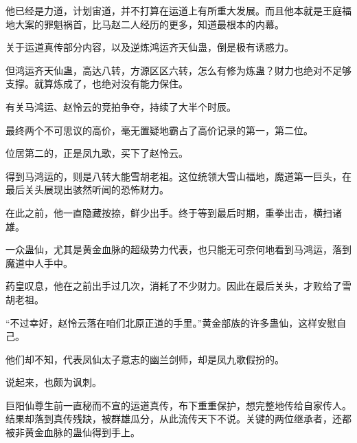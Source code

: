 \begin{this_body}
他已经是力道，计划宙道，并不打算在运道上有所重大发展。而且他本就是王庭福地大案的罪魁祸首，比马赵二人经历的更多，知道最根本的内幕。

关于运道真传部分内容，以及逆炼鸿运齐天仙蛊，倒是极有诱惑力。

但鸿运齐天仙蛊，高达八转，方源区区六转，怎么有修为炼蛊？财力也绝对不足够支撑。就算炼成了，也绝对没有能力保住。

有关马鸿运、赵怜云的竞拍争夺，持续了大半个时辰。

最终两个不可思议的高价，毫无置疑地霸占了高价记录的第一，第二位。

位居第二的，正是凤九歌，买下了赵怜云。

得到马鸿运的，则是八转大能雪胡老祖。这位统领大雪山福地，魔道第一巨头，在最后关头展现出骇然听闻的恐怖财力。

在此之前，他一直隐藏按捺，鲜少出手。终于等到最后时期，重拳出击，横扫诸雄。

一众蛊仙，尤其是黄金血脉的超级势力代表，也只能无可奈何地看到马鸿运，落到魔道中人手中。

药皇叹息，他在之前出手过几次，消耗了不少财力。因此在最后关头，才败给了雪胡老祖。

“不过幸好，赵怜云落在咱们北原正道的手里。”黄金部族的许多蛊仙，这样安慰自己。

他们却不知，代表凤仙太子意志的幽兰剑师，却是凤九歌假扮的。

说起来，也颇为讽刺。

巨阳仙尊生前一直秘而不宣的运道真传，布下重重保护，想完整地传给自家传人。结果却落到真传残缺，被群雄瓜分，从此流传天下不说。关键的两位继承者，还都被非黄金血脉的蛊仙得到手上。

\end{this_body}

